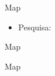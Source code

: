 \begin{frame}[fragile]{Map}

    \begin{itemize}
        \item Pesquisa:
    \end{itemize}

\end{frame}

\begin{frame}[fragile]{Map}


\end{frame}

\begin{frame}[fragile]{Map}


\end{frame}
